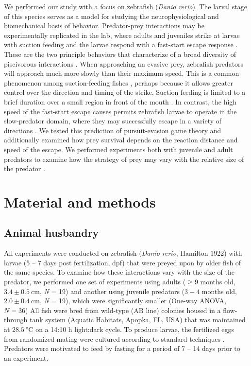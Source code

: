 \documentclass[]{rsos}%
\begin{document}
We performed our study with a focus on zebrafish (\textit{Danio rerio}). 
The larval stage of this species serves as a model for studying the neurophysiological \cite{Bianco:2015gm,Bagnall:2014iu,Huang:2013vj} and biomechanical \cite{Muller:2004hp,Li:2016cy} basis of behavior.
Predator-prey interactions may be experimentally replicated in the lab, where adults and juveniles strike at larvae with suction feeding and the larvae respond with a fast-start escape response \cite{Stewart:2013bha}.
These are the two principle behaviors that characterize of a broad diversity of piscivorous interactions \cite{Weihs:1984tb,Walker:2005vn,Higham:2007go,Higham:2005iu}. 
When approaching an evasive prey, zebrafish predators will approach much more slowly than their maximum speed.
This is a common phenomenon among suction-feeding fishes \cite{Higham:2005iu,Higham:2007go}, perhaps because it allows greater control over the direction and timing of the strike.
Suction feeding is limited to a brief duration over a small region in front of the mouth \cite{Holzman:2008jc,Holzman:2009uu}. 
In contrast, the high speed of the fast-start escape causes permits zebrafish larvae to operate in the slow-predator domain, where they may successfully escape in a variety of directions \cite{Soto:2015cj}.
We tested this prediction of pursuit-evasion game theory and additionally examined how prey survival depends on the reaction distance and speed of the escape.  
We performed experiments both with juvenile and adult predators to examine how the strategy of prey may vary with the relative size of the predator \cite{Fuiman:1994td}.


\section{Material and methods}

\subsection{Animal husbandry}
All experiments were conducted on zebrafish (\textit{Danio rerio}, Hamilton 1922) with larvae (5 -- 7 days post fertilization, dpf) that were preyed upon by older fish of the same species. 
To examine how these interactions vary with the size of the predator, we performed one set of experiments using adults ($\geq 9$ months old, $3.4 \pm \SI{0.5}{\cm}$, \textit{N} = 19) and another using juvenile predators ($3-4$ months old, $2.0  \pm  \SI{0.4}{\cm}$, \textit{N} = 19), which were significantly smaller (One-way ANOVA, $\textit{N} = 36$)
All fish were bred from wild-type (AB line) colonies housed in a flow-through tank system (Aquatic Habitats, Apopka, FL, USA) that was maintained at $\SI{28.5}{\celsius}$ on a 14:10 h light:dark cycle. 
To produce larvae, the fertilized eggs from randomized mating were cultured according to standard techniques \cite{Westerfield:UXiBrEuA}.
Predators were motivated to feed by fasting for a period of 7 -- 14 days prior to an experiment.
\end{document}
